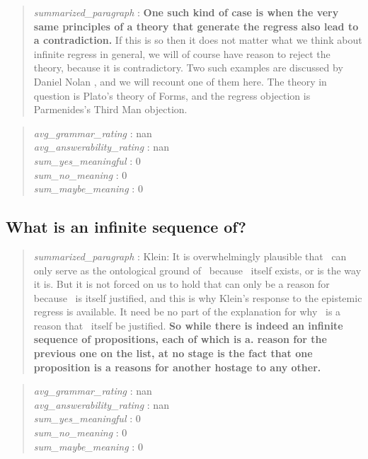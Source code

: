 \begin{quote}
\emph{summarized\_paragraph} : \textbf{One such kind of case is when the
very same principles of a theory that generate the regress also lead to
a contradiction.} If this is so then it does not matter what we think
about infinite regress in general, we will of course have reason to
reject the theory, because it is contradictory. Two such examples are
discussed by Daniel Nolan , and we will recount one of them here. The
theory in question is Plato's theory of Forms, and the regress objection
is Parmenides's Third Man objection.
\end{quote}

\begin{quote}
\emph{avg\_grammar\_rating} : nan\\
\emph{avg\_answerability\_rating} : nan\\
\emph{sum\_yes\_meaningful} : 0\\
\emph{sum\_no\_meaning} : 0\\
\emph{sum\_maybe\_meaning} : 0
\end{quote}

\hypertarget{what-is-an-infinite-sequence-of}{%
\subsection{What is an infinite sequence
of?}\label{what-is-an-infinite-sequence-of}}

\begin{quote}
\emph{summarized\_paragraph} : Klein: It is overwhelmingly plausible
that ~can only serve as the ontological ground of ~because ~itself
exists, or is the way it is. But it is not forced on us to hold that can
only be a reason for because ~is itself justified, and this is why
Klein's response to the epistemic regress is available. It need be no
part of the explanation for why ~is a reason that ~itself be justified.
\textbf{So while there is indeed an infinite sequence of propositions,
each of which is a. reason for the previous one on the list, at no stage
is the fact that one proposition is a reasons for another hostage to any
other.}
\end{quote}

\begin{quote}
\emph{avg\_grammar\_rating} : nan\\
\emph{avg\_answerability\_rating} : nan\\
\emph{sum\_yes\_meaningful} : 0\\
\emph{sum\_no\_meaning} : 0\\
\emph{sum\_maybe\_meaning} : 0
\end{quote}

